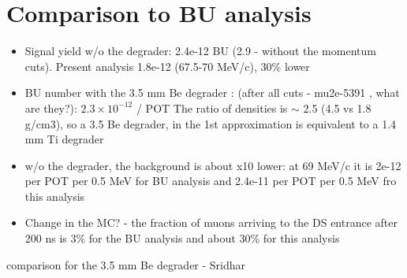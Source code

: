 \section{Comparison to BU analysis}

\begin{itemize}
\item 
  Signal yield w/o the degrader: 2.4e-12 BU (2.9 - without the momentum cuts).
  Present analysis 1.8e-12 (67.5-70 MeV/c), 30\% lower
\item
  BU number with the 3.5 mm Be degrader : (after all cuts - mu2e-5391 ,
  what are they?): $2.3 \times 10^{-12}$ / POT 
  The ratio of densities is $\sim$ 2.5 (4.5 vs 1.8 g/cm3),
  so a 3.5 Be degrader, in the 1st approximation is equivalent to a 1.4 mm Ti degrader
\item
  w/o the degrader, the background is about x10 lower:
  at 69 MeV/c it is 2e-12 per POT per 0.5 MeV for BU analysis
  and 2.4e-11 per POT per 0.5 MeV fro this analysis
\item
  Change in the MC? - the fraction of muons arriving to the DS entrance after 200 ns
  is 3\% for the BU analysis and about 30\% for this analysis
\end{itemize}


{\red
  comparison for the 3.5 mm Be degrader - Sridhar
}


